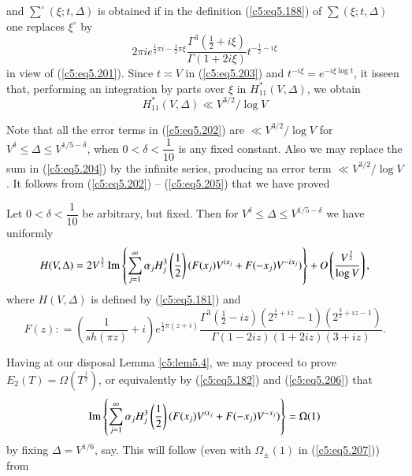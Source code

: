 and $\sum\limits^\circ (\xi; t, \Delta)$ is obtained if in the
definition (\ref{c5:eq5.188}) of $\sum(\xi; t, \Delta)$ one replaces
$\xi^\circ$ by 
$$
2 \pi i e^{\frac{1}{4} \pi i - \frac{1}{2} \pi \xi} \frac{\Gamma^3
  \left(\frac{1}{2} + i \xi\right)}{\Gamma (1+2i\xi)} t^{-\frac{1}{2} - i \xi} 
$$ 
in view of (\ref{c5:eq5.201}). Since $t \asymp V$ in
(\ref{c5:eq5.203}) and $t^{-i\xi} = e^{-i\xi \log t}$, it
is\pageoriginale seen that, performing an integration by parts over
$\xi$ in $H^*_{11}(V,\Delta)$, we obtain 
\begin{equation}
H^*_{11} (V,\Delta) \ll V^{3/2} / \log V\label{c5:eq5.205}
\end{equation}

Note that all the error terms in (\ref{c5:eq5.202}) are $\ll V^{3/2}/
\log V$ for $V^{\delta} \leq \Delta \leq V^{1/5 - \delta}$, when $0 <
\delta < \dfrac{1}{10}$ is any fixed constant. Also we may replace the
sum in (\ref{c5:eq5.204}) by the infinite series, producing na error
term $\ll V^{3/2} / \log V$. It follows from (\ref{c5:eq5.202}) --
(\ref{c5:eq5.205}) that we have proved 

\begin{lemma}\label{c5:lem5.4}
Let $0 < \delta < \dfrac{1}{10}$ be arbitrary, but fixed. Then for $V^\delta \leq \Delta \leq V^{1/5-\delta}$ we have uniformly
{\fontsize{9}{11}\selectfont
\begin{equation}
H (V,\Delta) = 2V^{\frac{3}{2}} \operatorname{Im} \left\{ \sum\limits^{\infty}_{j=1}
\alpha_j H^3_j \left(\frac{1}{2} \right) (F(x_j) V^{i x_j} + F (-x_j)
V^{-ix_j}) \right\} + O \left(\frac{V^{\frac{3}{2}}}{\log V} \right),
\label{c5:eq5.206} 
\end{equation}}
where $H(V,\Delta)$ is defined by (\ref{c5:eq5.181}) and 
$$
F(z): = \left( \frac{1}{sh(\pi z)} + i\right) e^{\frac{1}{2} \pi(z+i)} 
\frac{\Gamma^3 \left(\frac{1}{2} - i z\right) \left(2^{\frac{1}{2} + i
    z} -1\right) 
  \left(2^{\frac{3}{2} + i z -1 }\right)}{\Gamma(1-2 iz) (1+2iz)
  (3+iz)}.   
$$

Having at our disposal Lemma \ref{c5:lem5.4}, we may proceed to prove\break
$E_2(T) = \Omega (T^{\frac{1}{2}})$, or equivalently by
(\ref{c5:eq5.182}) and (\ref{c5:eq5.206}) that 
\begin{equation}
\operatorname{Im} \left\{ \sum\limits^\infty_{j=1} \alpha_j H^3_j \left(\frac{1}{2}
\right) (F(x_j) V^{ix_j} + F(-x_j) V^{-x_j})  \right\} = \Omega (1)
\label{c5:eq5.207} 
\end{equation}
by fixing $\Delta = V^{1/6}$, say. This will follow (even with
$\Omega_{\pm} (1)$ in (\ref{c5:eq5.207})) from 
\end{lemma}

